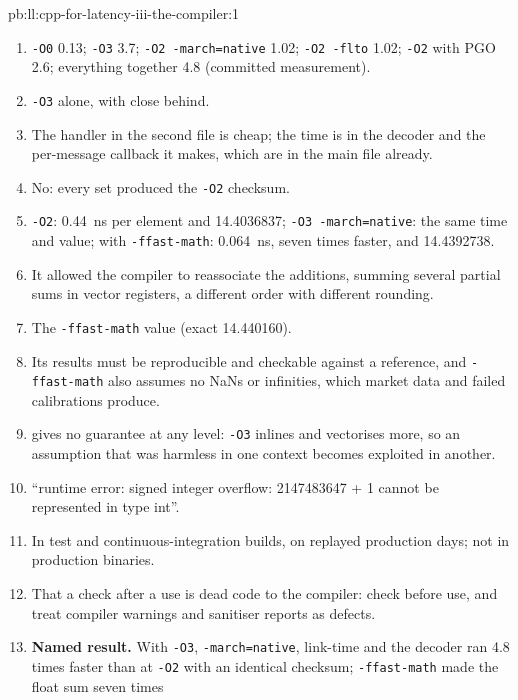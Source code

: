 \begin{solution}{pb:ll:cpp-for-latency-iii-the-compiler:1}
\begin{enumerate}
\item \texttt{-O0} 0.13; \texttt{-O3} 3.7; \texttt{-O2 -march=native} 1.02; \texttt{-O2 -flto} 1.02; \texttt{-O2} with
PGO 2.6; everything together 4.8 (committed measurement).
\item \texttt{-O3} alone, with  close behind.
\item The handler in the second file is cheap; the time is in the decoder and the per-message callback it makes, which are
in the main file already.
\item No: every set produced the \texttt{-O2} checksum.
\item \texttt{-O2}: \qty{0.44}{\nano\second} per element and 14.4036837; \texttt{-O3 -march=native}: the same time and
value; with \texttt{-ffast-math}: \qty{0.064}{\nano\second}, seven times faster, and 14.4392738.
\item It allowed the compiler to reassociate the additions, summing several partial sums in vector registers, a different
order with different rounding.
\item The \texttt{-ffast-math} value (exact 14.440160).
\item Its results must be reproducible and checkable against a reference, and \texttt{-ffast-math} also assumes no NaNs or
infinities, which market data and failed calibrations produce.
\item {} gives no guarantee at any level: \texttt{-O3} inlines and vectorises more, so an assumption that
was harmless in one context becomes exploited in another.
\item ``runtime error: signed integer overflow: 2147483647 + 1 cannot be represented in type int''.
\item In test and continuous-integration builds, on replayed production days; not in production binaries.
\item That a check after a use is dead code to the compiler: check before use, and treat compiler warnings and sanitiser
reports as defects.
\item \textbf{Named result.} With \texttt{-O3}, \texttt{-march=native}, link-time and  the decoder
ran 4.8 times faster than at \texttt{-O2} with an identical checksum; \texttt{-ffast-math} made the float sum seven times

\end{enumerate}
\end{solution}
